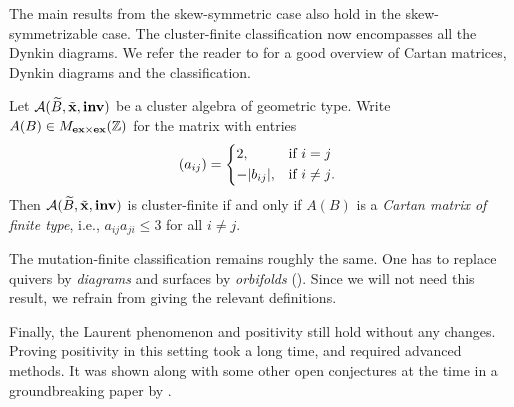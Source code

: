 The main results from the skew-symmetric case also hold in the skew-symmetrizable case.
The cluster-finite classification now encompasses all the Dynkin diagrams. We refer the
reader to \cite[Chapter 5]{FominWilliams2021IntroductionCA_4-5} for a good overview of
Cartan matrices, Dynkin diagrams and the classification.
\begin{theorem}\label{thm:cluster_finite_general_case}

	Let $\mathcal{A}(\widetilde{B}, \tilde{\mathbf{x}}, \mathbf{inv})$ be a cluster algebra of geometric type. Write $A(B) \in
		M_{\mathbf{ex} \times \mathbf{ex}}(\mathbb{Z})$ for the matrix with entries
	\begin{equation*}
		(a_{ij}) = \begin{dcases*}
			2,         & if $i = j$     \\
			-|b_{ij}|, & if $i \neq j$.
		\end{dcases*}
	\end{equation*}
	Then $\mathcal{A}(\widetilde{B}, \tilde{\mathbf{x}}, \mathbf{inv})$ is cluster-finite if and only if $A(B)$ is a \emph{Cartan
		matrix of finite type}, i.e., $a_{ij}a_{ji} \leq 3$ for all $i
		\neq j$.
\end{theorem}

The mutation-finite classification remains roughly the same. One has to replace quivers
by \emph{diagrams} and surfaces by \emph{orbifolds}
(\cite{FeliksonPavel2023cluster}). Since we will not need this result, we refrain from
giving the relevant definitions.

Finally, the Laurent phenomenon and positivity still hold without any changes. Proving
positivity in this setting took a long time, and required advanced methods. It was
shown along with some other open conjectures at the time in a groundbreaking paper by
\textcite{GrossHackingKeelKontsevich2018CanonicalBCA}.

